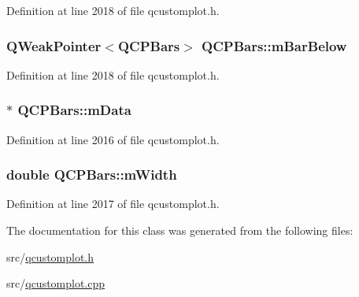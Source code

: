 Definition at line 2018 of file qcustomplot.\-h.

\hypertarget{class_q_c_p_bars_a4b8f2970648337e596fca90ebcfdfda9}{
\subsubsection[{m\-Bar\-Below}]{\setlength{\rightskip}{0pt plus 5cm}Q\-Weak\-Pointer$<${\bf Q\-C\-P\-Bars}$>$ Q\-C\-P\-Bars\-::m\-Bar\-Below\hspace{0.3cm}{\ttfamily [protected]}}}\label{class_q_c_p_bars_a4b8f2970648337e596fca90ebcfdfda9}


Definition at line 2018 of file qcustomplot.\-h.

\hypertarget{class_q_c_p_bars_aef28d29d51ef84b608ecd22c55d531ff}{
\subsubsection[{m\-Data}]{$\ast$ Q\-C\-P\-Bars\-::m\-Data\hspace{0.3cm}{\ttfamily [protected]}}}\label{class_q_c_p_bars_aef28d29d51ef84b608ecd22c55d531ff}


Definition at line 2016 of file qcustomplot.\-h.

\hypertarget{class_q_c_p_bars_a7c4e0f2246f8133f48a9c3f24cf5b920}{
\subsubsection[{m\-Width}]{\setlength{\rightskip}{0pt plus 5cm}double Q\-C\-P\-Bars\-::m\-Width\hspace{0.3cm}{\ttfamily [protected]}}}\label{class_q_c_p_bars_a7c4e0f2246f8133f48a9c3f24cf5b920}


Definition at line 2017 of file qcustomplot.\-h.



The documentation for this class was generated from the following files\-:\begin{DoxyCompactItemize}
\item 
src/\hyperlink{qcustomplot_8h}{qcustomplot.\-h}\item 
src/\hyperlink{qcustomplot_8cpp}{qcustomplot.\-cpp}\end{DoxyCompactItemize}
